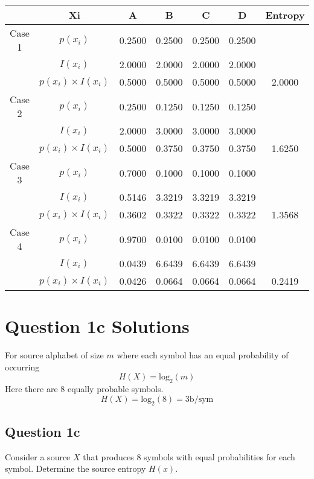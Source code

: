 \documentclass[a4paper,12pt]{article}
\begin{document}
\begin{center}
\begin{tabular}{|c|c|c|c|c|c|c|}
\hline	&	Xi	&	A 	&	B	&	C	&	D	&	Entropy	\\ \hline \hline
Case 1	&	$p(x_i)$	&	0.2500	&	0.2500	&	0.2500	&	0.2500	&		\\ \hline
	&	$I(x_i)$	&	2.0000	&	2.0000	&	2.0000	&	2.0000	&		\\ \hline
	&	$p(x_i)\times I(x_i)$	&	0.5000	&	0.5000	&	0.5000	&	0.5000	&	2.0000	\\ \hline \hline
Case 2	&	$p(x_i)$	&	0.2500	&	0.1250	&	0.1250	&	0.1250	&		\\ \hline
	&	$I(x_i)$	&	2.0000	&	3.0000	&	3.0000	&	3.0000	&		\\ \hline
	&	$p(x_i)\times I(x_i)$	&	0.5000	&	0.3750	&	0.3750	&	0.3750	&	1.6250	\\ \hline \hline
Case 3	&	$p(x_i)$	&	0.7000	&	0.1000	&	0.1000	&	0.1000	&		\\ \hline
	&	$I(x_i)$	&	0.5146	&	3.3219	&	3.3219	&	3.3219	&		\\ \hline
	&	$p(x_i)\times I(x_i)$	&	0.3602	&	0.3322	&	0.3322	&	0.3322	&	1.3568	\\ \hline \hline
Case 4 	&	$p(x_i)$	&	0.9700	&	0.0100	&	0.0100	&	0.0100	&		\\ \hline
	&	$I(x_i)$	&	0.0439	&	6.6439	&	6.6439	&	6.6439	&		\\ \hline
	&	$p(x_i)\times I(x_i)$	&	0.0426	&	0.0664	&	0.0664	&	0.0664	&	0.2419	\\ \hline 

\end{tabular} 
\end{center}
\section*{Question 1c Solutions}

For source alphabet of size $m$ where each symbol has an equal probability of occurring
\[H(X) = \mbox{log}_2(m)\]
Here there are 8 equally probable symbols.
\[H(X) = \mbox{log}_2(8) = 3\mbox{b/sym}\]


\subsection*{Question 1c}
Consider a source $X$ that produces 8 symbols with equal probabilities for each symbol. Determine the source entropy $H(x)$. 
\end{document}
